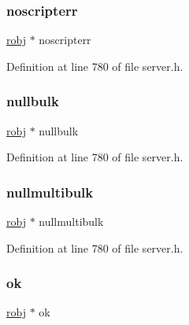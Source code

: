 \subsubsection{\texorpdfstring{noscripterr}{noscripterr}}
{\footnotesize\ttfamily \hyperlink{server_8h_a540f174d2685422fbd7d12e3cd44c8e2}{robj} $\ast$ noscripterr}



Definition at line 780 of file server.\+h.

\mbox{\label{structshared_objects_struct_a9b39b9335155d55eb2e631def6827b82}} 
\subsubsection{\texorpdfstring{nullbulk}{nullbulk}}
{\footnotesize\ttfamily \hyperlink{server_8h_a540f174d2685422fbd7d12e3cd44c8e2}{robj} $\ast$ nullbulk}



Definition at line 780 of file server.\+h.

\mbox{\label{structshared_objects_struct_ac85b834d303fa79baa4900ba584e580e}} 
\subsubsection{\texorpdfstring{nullmultibulk}{nullmultibulk}}
{\footnotesize\ttfamily \hyperlink{server_8h_a540f174d2685422fbd7d12e3cd44c8e2}{robj} $\ast$ nullmultibulk}



Definition at line 780 of file server.\+h.

\mbox{\label{structshared_objects_struct_adf30e1960aaa30991c8cc6f5d1b8f1f5}} 
\subsubsection{\texorpdfstring{ok}{ok}}
{\footnotesize\ttfamily \hyperlink{server_8h_a540f174d2685422fbd7d12e3cd44c8e2}{robj} $\ast$ ok}




